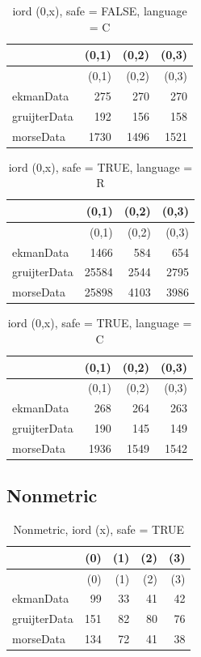 \documentclass[
  12pt,
  letterpaper,
  DIV=11,
  numbers=noendperiod]{scrartcl}
\begin{document}
\begin{longtable}[]{@{}lrrr@{}}
\caption{iord (0,x), safe = FALSE, language = C}\tabularnewline
\toprule\noalign{}
& (0,1) & (0,2) & (0,3) \\
\midrule\noalign{}
\endfirsthead
\toprule\noalign{}
& (0,1) & (0,2) & (0,3) \\
\midrule\noalign{}
\endhead
\bottomrule\noalign{}
\endlastfoot
ekmanData & 275 & 270 & 270 \\
gruijterData & 192 & 156 & 158 \\
morseData & 1730 & 1496 & 1521 \\
\end{longtable}

\begin{longtable}[]{@{}lrrr@{}}
\caption{iord (0,x), safe = TRUE, language = R}\tabularnewline
\toprule\noalign{}
& (0,1) & (0,2) & (0,3) \\
\midrule\noalign{}
\endfirsthead
\toprule\noalign{}
& (0,1) & (0,2) & (0,3) \\
\midrule\noalign{}
\endhead
\bottomrule\noalign{}
\endlastfoot
ekmanData & 1466 & 584 & 654 \\
gruijterData & 25584 & 2544 & 2795 \\
morseData & 25898 & 4103 & 3986 \\
\end{longtable}

\begin{longtable}[]{@{}lrrr@{}}
\caption{iord (0,x), safe = TRUE, language = C}\tabularnewline
\toprule\noalign{}
& (0,1) & (0,2) & (0,3) \\
\midrule\noalign{}
\endfirsthead
\toprule\noalign{}
& (0,1) & (0,2) & (0,3) \\
\midrule\noalign{}
\endhead
\bottomrule\noalign{}
\endlastfoot
ekmanData & 268 & 264 & 263 \\
gruijterData & 190 & 145 & 149 \\
morseData & 1936 & 1549 & 1542 \\
\end{longtable}

\subsection{Nonmetric}\label{nonmetric}

\begin{longtable}[]{@{}lrrrr@{}}
\caption{Nonmetric, iord (x), safe = TRUE}\tabularnewline
\toprule\noalign{}
& (0) & (1) & (2) & (3) \\
\midrule\noalign{}
\endfirsthead
\toprule\noalign{}
& (0) & (1) & (2) & (3) \\
\midrule\noalign{}
\endhead
\bottomrule\noalign{}
\endlastfoot
ekmanData & 99 & 33 & 41 & 42 \\
gruijterData & 151 & 82 & 80 & 76 \\
morseData & 134 & 72 & 41 & 38 \\
\end{longtable}
\end{document}
